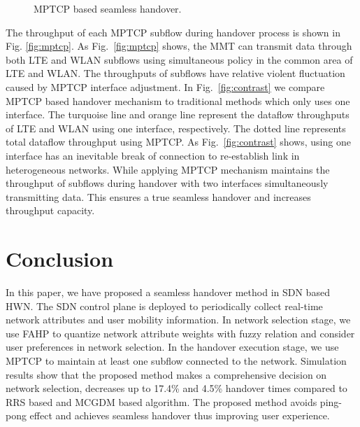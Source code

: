\documentclass[conference]{IEEEtran}
\begin{document}
\begin{comment}
	\centering
	\texttt{[image: figures/Fig\_3.eps]}
	\caption{MPTCP based seamless handover.}\label{fig:seamless0}
	\vspace{-1em}
	\end{figure}
\end{comment}
\begin{figure}[htbp!]
	\centering
	\caption{MPTCP based seamless handover.}
	\label{fig:seamless}
\end{figure}
The throughput of each MPTCP subflow during handover process is shown in  Fig. \ref{fig:mptcp}. 
As Fig.~\ref{fig:mptcp} shows, the MMT can transmit data through both LTE and WLAN subflows using simultaneous policy in the common area of LTE and WLAN.
The throughputs of subflows have relative violent fluctuation caused by MPTCP interface adjustment.
In Fig.~\ref{fig:contrast} we compare MPTCP based handover mechanism to traditional methods which only uses one interface.
The turquoise line and orange line represent the dataflow throughputs of LTE and WLAN using one interface, respectively.
The dotted line represents total dataflow throughput using MPTCP.
As Fig.~\ref{fig:contrast} shows, using one interface has an inevitable break of connection to re-establish link in heterogeneous networks.
While applying MPTCP mechanism maintains the throughput of subflows during handover with two interfaces simultaneously transmitting data. This ensures a true seamless handover and increases throughput capacity.





\section{Conclusion}
In this paper, we have proposed a seamless handover method in SDN based HWN.
The SDN control plane is deployed to periodically collect real-time network attributes and user mobility information.
In network selection stage, we use FAHP to quantize network attribute weights with fuzzy relation and consider user preferences in network selection.
In the handover execution stage, we use MPTCP to %
maintain at least one subflow connected to the network. 
Simulation results show that the proposed method makes a comprehensive decision on network selection, decreases
up to 17.4\% and 4.5\% handover times compared to RRS based and MCGDM based algorithm. The proposed method avoids ping-pong effect and achieves seamless handover thus improving
user experience.
\end{document}

